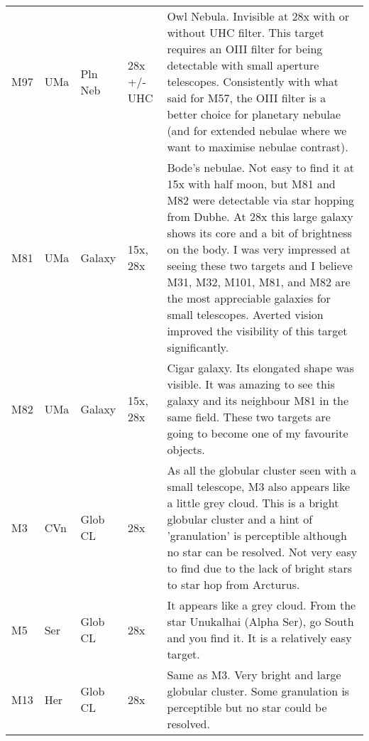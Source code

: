 \begin{longtable}{ p{0.7in}  p{0.3in}  p{0.6in}  p{0.9in}  p{5.8in} }
M97 & UMa & Pln Neb & 28x +/- UHC & Owl Nebula. Invisible at 28x with or without UHC filter. This target requires an OIII filter for being detectable with small aperture telescopes. Consistently with what said for M57, the OIII filter is a better choice for planetary nebulae (and for extended nebulae where we want to maximise nebulae contrast). \\ 
M81 & UMa & Galaxy & 15x, 28x & Bode's nebulae. Not easy to find it at 15x with half moon, but M81 and M82 were detectable via star hopping from Dubhe. At 28x this large galaxy shows its core and a bit of brightness on the body. I was very impressed at seeing these two targets and I believe M31, M32, M101, M81, and M82 are the most appreciable galaxies for small telescopes. Averted vision improved the visibility of this target significantly. \\ 
M82 & UMa & Galaxy & 15x, 28x & Cigar galaxy. Its elongated shape was visible. It was amazing to see this galaxy and its neighbour M81 in the same field. These two targets are going to become one of my favourite objects.   \\ 
M3 & CVn & Glob CL & 28x & As all the globular cluster seen with a small telescope, M3 also appears like a little grey cloud. This is a bright globular cluster and a hint of 'granulation' is perceptible although no star can be resolved. Not very easy to find due to the lack of bright stars to star hop from Arcturus. \\ 
M5 & Ser & Glob CL & 28x & It appears like a grey cloud. From the star Unukalhai (Alpha Ser), go South and you find it. It is a relatively easy target.  \\ 
M13 & Her & Glob CL & 28x & Same as M3. Very bright and large globular cluster. Some granulation is perceptible but no star could be resolved. \\ 
\hline 
\end{longtable} 
